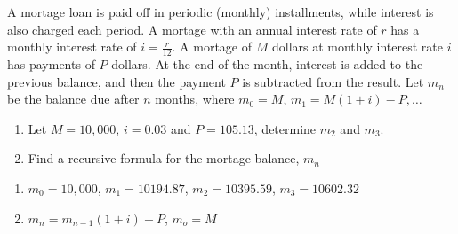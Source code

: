 \begin{questions}
 A mortage loan is paid off in periodic (monthly) installments, while interest is also charged each period.  A mortage with an annual interest rate of $r$ has a monthly interest rate of $i = \frac{r}{12}$.  A mortage of $M$ dollars at monthly interest rate $i$ has payments of $P$ dollars.  At the end of the month, interest is added to the previous balance, and then the payment $P$ is subtracted from the result.  Let $m_n$ be the balance due after $n$ months, where $m_0 = M$, $m_1 = M(1+i) - P, \ldots$
\begin{enumerate}[label=(\alph*),itemsep=0pt,parsep=0pt,
    topsep=0pt,partopsep=0pt]
    \item Let $M = 10,000$, $i = 0.03$ and $P = 105.13$, determine $m_2$ and $m_3$.
    \item Find a recursive formula for the mortage balance, $m_n$
\end{enumerate}
    \ifprintanswers
        \vspace{-10pt}
   \fi
\begin{solution}
    \begin{enumerate}[label=(\alph*),itemsep=0pt,parsep=0pt,
    topsep=0pt,partopsep=0pt]
        \item $m_0 = 10,000$, $m_1 = 10194.87$, $m_2 = 10395.59$, $m_3 =  10602.32$
        \item $m_n = m_{n-1}(1+i) - P$, $m_o = M$
    \end{enumerate}
\end{solution}

\ifprintanswers
\else
\newpage
\fi
{}



\end{questions}
